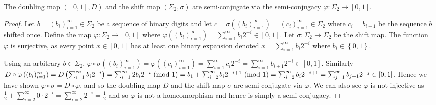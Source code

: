 \begin{prop} \label{prop:doubling-shift-semi-conjugate}
    The doubling map $([0, 1], D)$ and the shift map $(\Sigma_2, \sigma)$ are semi-conjugate via the semi-conjugacy $\varphi: \Sigma_2 \to [0, 1]$.
    \begin{proof}
        Let $\underline{b} = (b_i)_{i=1}^{\infty} \in \Sigma_2$ be a sequence of binary digits and let $\underline{c} = \sigma\left((b_i)_{i=1}^{\infty}\right) = (c_i)_{i=1}^{\infty} \in \Sigma_2$ where $c_i = b_{i + 1}$ be the sequence $\underline{b}$ shifted once. Define the map $\varphi: \Sigma_2 \to [0, 1]$ where $\varphi\left((b_i)_{i=1}^{\infty}\right) = \sum_{i=1}^{\infty} b_i2^{-i} \in [0, 1]$. Let $\sigma: \Sigma_2 \to \Sigma_2$ be the shift map. The function $\varphi$ is surjective, as every point $x \in [0, 1]$ has at least one binary expansion denoted $x=\sum_{i=1}^{\infty}b_i2^{-i}$ where $b_i \in \left\lbrace 0, 1 \right\rbrace$.
        \begin{center}
        \end{center}
        Using an arbitrary $\underline{b} \in \Sigma_2$, $\varphi \circ \sigma\left((b_i)_{i=1}^{\infty}\right) = \varphi\left((c_i)_{i=1}^{\infty}\right) = \sum_{i=1}^{\infty} c_i2^{-i} = \sum_{i=1}^{\infty} b_{i+1}2^{-i} \in [0, 1]$. Similarly $D \circ \varphi\left((b_i)_{i=1}^{\infty}\right) = D\left(\sum_{i=1}^{\infty} b_i2^{-i}\right) = \sum_{i=1}^{\infty} 2b_i2^{-i} \ (\mathrm{mod}\ 1) = b_1 + \sum_{i=2}^{\infty} b_i2^{-i+1} \ (\mathrm{mod}\ 1) = \sum_{i=2}^{\infty} b_i2^{-i+1} = \sum_{j=1}^{\infty} b_{j+1}2^{-j} \in [0, 1]$. Hence we have shown $\varphi \circ \sigma = D \circ \varphi$. and so the doubling map $D$ and the shift map $\sigma$ are semi-conjugate via $\varphi$. We can also see $\varphi$ is not injective as $\frac{1}{2} + \sum_{i=2}^{\infty}0 \cdot 2^{-i} = \sum_{i=2}^{\infty}2^{-i} = \frac{1}{2}$ and so $\varphi$ is not a homeomorphism and hence is simply a semi-conjugacy. 
    \end{proof}
\end{prop}

